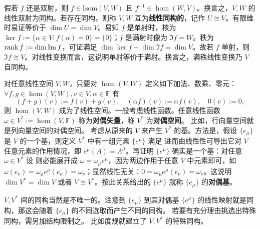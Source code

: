假若 $f$ 还是双射，则 $f\in\mathrm{Isom}(V, W)$ 且 $f^{-1}\in\hom(W,V)$。换言之，$V,W$ 的线性双射为同构。若存在同构，则称 $V,W$ 互为\textbf{线性同构的}，记作 $U\cong V$。有限维时易证等价于 $\dim U=\dim V$。易知 $f$ 是单射时，核为 $\ker f:=\{\alpha\in V:f(\alpha)=0\}=\{0\}$；$f$ 是满射时像为 $\Im f=W$。秩为 $\rank f:=\dim \Im f$，可证满足 $\dim \ker f + \dim \Im f = \dim V$。故若 $f$ 单射，则 $\Im f\cong V$。对线性变换而言，这说明单射等价于满射。换言之，满秩线性变换乃 $V$ 自同构。

对任意线性空间 $V,W$，只要对 $\hom(V,W)$ 定义如下加法、数乘、零元：$\forall f,g\in \hom(V,W),v\in V,\alpha\in\mathbb F$ 有
\[(f+g)(v):=f(v)+g(v),\quad (\alpha f)(v):=\alpha f(v),\quad 0(v):=0,\]
则 $\hom(V,W)$ 成为了线性空间。一般考虑线性函数。任意线性函数 $\omega\in V^*:=\hom(V,\mathbb F)$ 称为\textbf{对偶矢量}，称 $V^*$ 为\textbf{对偶空间}。
比如，行向量空间就是列向量空间的对偶空间。
考虑从原来的 $V$ 来产生 $V^*$ 的基。方法是，假设 $\{e_\mu\}$ 是 $V$ 的一个基，则定义 $V^*$ 中有一组元素 $\{e^\mu\}$ 满足
进而由线性性可导出它对 $V$ 任意元素的作用情况，即 $e^\mu(A)=A^\mu$。再证明 $\{e^\mu\}$ 确实是一个基：对任意 $\omega\in V^*$ 设
则必能展开成 $\omega=\omega_\mu e^\mu$，因为两边作用于任意 $V$ 中元素即可，如 $\omega(e_\nu)=\omega_\mu e^\mu(e_\nu)=\omega_\nu$；显然线性无关：$0=\omega_\mu e^\mu(e_\nu)=\omega_\nu$。这说明 $\dim V^*=\dim V$ 或者 $V\cong V^*$。按此关系给出的 $\{e^\mu\}$ 就称 $\{e_\mu\}$ 的\textbf{对偶基}。

$V,V^*$ 间的同构当然是不唯一的。注意到 $\{e_\mu\}$ 到其对偶基 $\{e^\mu\}$ 的线性映射就是同构，那这会随着 $\{e_\mu\}$ 的不同选取而产生不同的同构。
若要有充分理由挑选出特殊同构，需另加结构限制之。
比如度规就建立了 $V,V^*$ 的特殊同构。

